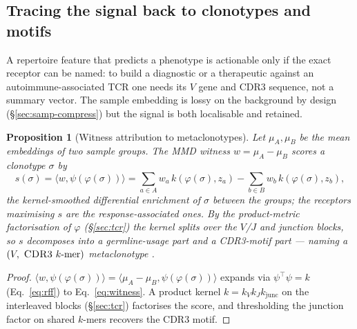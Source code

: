 \documentclass[11pt]{article}
\theoremstyle{oldplain}
\newtheorem{proposition}{Proposition}
\theoremstyle{oldrem}
\newcommand{\junc}{\mathrm{junc}}
\begin{document}
\subsection{Tracing the signal back to clonotypes and motifs}\label{sec:samp-trace}

A repertoire feature that predicts a phenotype is actionable only if the exact receptor can be named: to build a
diagnostic or a therapeutic against an autoimmune-associated {\scshape TCR} one needs its $V$ gene and
{\scshape CDR3} sequence, not a summary vector. The sample embedding is lossy on the background by design
(\S\ref{sec:samp-compress}) but the signal is both localisable and retained.

\begin{proposition}[Witness attribution to metaclonotypes]\label{prop:witness}
Let $\mu_A,\mu_B$ be the mean embeddings of two sample groups. The {\scshape MMD} witness $w=\mu_A-\mu_B$
\cite{Gretton2012} scores a clonotype $\sigma$ by
\begin{equation}\label{eq:witness}
  s(\sigma)=\langle w,\psi(\varphi(\sigma))\rangle
  =\sum_{a\in A}w_a\,k(\varphi(\sigma),z_a)-\sum_{b\in B}w_b\,k(\varphi(\sigma),z_b),
\end{equation}
the kernel-smoothed differential enrichment of $\sigma$ between the groups; the receptors maximising $s$ are the
response-associated ones. By the product-metric factorisation of $\varphi$ (\S\ref{sec:tcr}) the kernel splits
over the $V$/$J$ and junction blocks, so $s$ decomposes into a germline-usage part and a {\scshape CDR3}-motif
part --- naming a $(V,\ \text{{\scshape CDR3} $k$-mer})$ \emph{metaclonotype} \cite{Glanville2017,Dash2017}.
\end{proposition}
\begin{proof}
$\langle w,\psi(\varphi(\sigma))\rangle=\langle\mu_A-\mu_B,\psi(\varphi(\sigma))\rangle$ expands via
$\psi^\top\psi=k$ (Eq.~\eqref{eq:rff}) to Eq.~\eqref{eq:witness}. A product kernel $k=k_V k_J k_{\junc}$ on the
interleaved blocks (\S\ref{sec:tcr}) factorises the score, and thresholding the junction factor on shared
$k$-mers recovers the {\scshape CDR3} motif. \end{proof}
\end{document}
